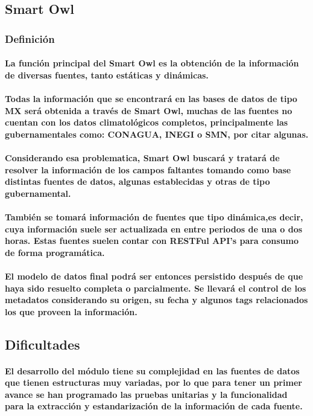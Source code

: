 \subsection{Smart Owl}
    \subsubsection{Definición}
      \paragraph{La función principal del Smart Owl es la obtención de la información de diversas fuentes, tanto estáticas y dinámicas.}
      \paragraph{Todas la información que se encontrará en las bases de datos de tipo MX será obtenida a través de Smart Owl, muchas de las fuentes no cuentan con los datos climatológicos completos, principalmente las gubernamentales como: CONAGUA, INEGI o SMN, por citar algunas.}
      \paragraph{Considerando esa problematica, Smart Owl buscará y tratará de resolver la información de los campos faltantes tomando como base distintas fuentes de datos, algunas establecidas y otras de tipo gubernamental.}
      \paragraph{También se tomará información de fuentes que tipo dinámica,es decir, cuya información suele ser actualizada en entre periodos de una o dos horas. Estas fuentes suelen contar con RESTFul API's para consumo de forma programática.}
      \paragraph{El modelo de datos final podrá ser entonces persistido después de que haya sido resuelto completa o parcialmente. Se llevará el control de los metadatos considerando su origen, su fecha y algunos tags relacionados los que proveen la información.}
    \newpage
     \subsection{Dificultades}
      \paragraph{El desarrollo del módulo tiene su complejidad en las fuentes de datos que tienen estructuras muy variadas, por lo que para tener un primer avance se han programado las pruebas unitarias y la funcionalidad para la extracción y estandarización de la información de cada fuente.}
